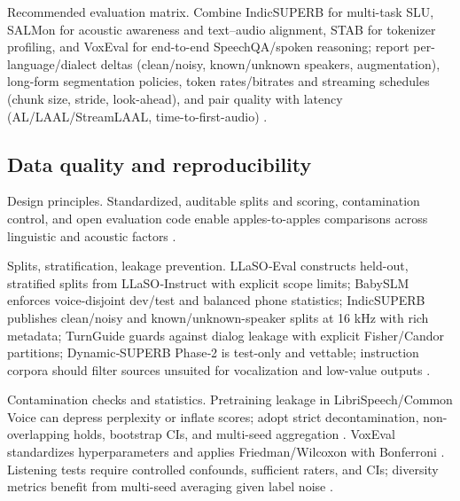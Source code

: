 \documentclass{article}
\begin{document}
Recommended evaluation matrix. Combine IndicSUPERB for multi-task SLU, SALMon for acoustic awareness and text–audio alignment, STAB for tokenizer profiling, and VoxEval for end-to-end SpeechQA/spoken reasoning; report per-language/dialect deltas (clean/noisy, known/unknown speakers, augmentation), long-form segmentation policies, token rates/bitrates and streaming schedules (chunk size, stride, look-ahead), and pair quality with latency (AL/LAAL/StreamLAAL, time-to-first-audio) \cite{entry2025indicsuperbspeechprocessinguniversalperf,maimon2025salmonsuiteacousticlanguagemodelevaluati,vashishth2024stabspeechtokenizerassessmentbenchmark,cui2025voxevalbenchmarkingknowledgeunderstandin,zhang2025impactframeratesspeechtokenizercasestudy}.

\subsection{Data quality and reproducibility} \label{subsec:Data quality and reproducibility}

Design principles. Standardized, auditable splits and scoring, contamination control, and open evaluation code enable apples-to-apples comparisons across linguistic and acoustic factors \cite{entry2025indicsuperbspeechprocessinguniversalperf,maimon2025salmonsuiteacousticlanguagemodelevaluati}.

Splits, stratification, leakage prevention. LLaSO‑Eval constructs held-out, stratified splits from LLaSO‑Instruct with explicit scope limits; BabySLM enforces voice-disjoint dev/test and balanced phone statistics; IndicSUPERB publishes clean/noisy and known/unknown-speaker splits at 16 kHz with rich metadata; TurnGuide guards against dialog leakage with explicit Fisher/Candor partitions; Dynamic‑SUPERB Phase‑2 is test-only and vettable; instruction corpora should filter sources unsuited for vocalization and low-value outputs \cite{sun2025llasofoundationalframeworkreproduciblere,lavechin2023babyslmlanguageacquisitionfriendlybenchm,cui2025thinkbeforeyoutalkenhancingmeaningfuldia,huang2025dynamicsuperbphase2collaborativelyexpand,shu2023llasmlargelanguagespeechmodel}.

Contamination checks and statistics. Pretraining leakage in LibriSpeech/Common Voice can depress perplexity or inflate scores; adopt strict decontamination, non-overlapping holds, bootstrap CIs, and multi-seed aggregation \cite{tseng2025evaluationllmsspeechisoftenflawedtestset}. VoxEval standardizes hyperparameters and applies Friedman/Wilcoxon with Bonferroni \cite{cui2025voxevalbenchmarkingknowledgeunderstandin}. Listening tests require controlled confounds, sufficient raters, and CIs; diversity metrics benefit from multi-seed averaging given label noise \cite{wang2024evaluatingtextspeechsynthesislargediscre,futeral2025madspeechmeasuresacousticdiversity}.
\end{document}
